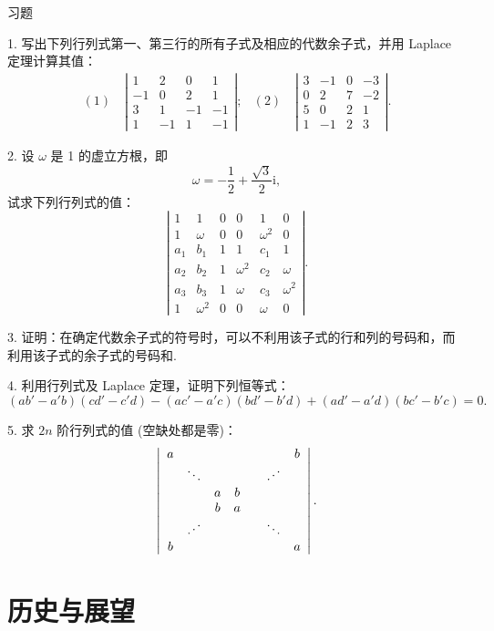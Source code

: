 \documentclass[UTF8,12pt,a4paper,fontset=fandol]{ctexart}
\begin{document}
\begin{center}
习\quad 题
\end{center}

1. 写出下列行列式第一、第三行的所有子式及相应的代数余子式，并用 Laplace 定理计算其值：
\[
\begin{array}{ll}
(1)\quad
\left|\begin{array}{rrrr}
1&2&0&1\\
-1&0&2&1\\
3&1&-1&-1\\
1&-1&1&-1
\end{array}\right|;
&
(2)\quad
\left|\begin{array}{rrrr}
3&-1&0&-3\\
0&2&7&-2\\
5&0&2&1\\
1&-1&2&3
\end{array}\right|.
\end{array}
\]

2. 设 $\omega$ 是 1 的虚立方根，即
\[
\omega=-\frac{1}{2}+\frac{\sqrt{3}}{2}\mathrm{i},
\]
试求下列行列式的值：
\[
\left|\begin{array}{cccccc}
1&1&0&0&1&0\\
1&\omega&0&0&\omega^2&0\\
a_1&b_1&1&1&c_1&1\\
a_2&b_2&1&\omega^2&c_2&\omega\\
a_3&b_3&1&\omega&c_3&\omega^2\\
1&\omega^2&0&0&\omega&0
\end{array}\right|.
\]

3. 证明：在确定代数余子式的符号时，可以不利用该子式的行和列的号码和，而利用该子式的余子式的号码和.

4. 利用行列式及 Laplace 定理，证明下列恒等式：
\[
(ab'-a'b)(cd'-c'd)-(ac'-a'c)(bd'-b'd)+(ad'-a'd)(bc'-b'c)=0.
\]

5. 求 $2n$ 阶行列式的值 (空缺处都是零)：
\[
\left|\begin{array}{ccccccc}
a&&&&&&b\\
&\ddots&&&&\reflectbox{$\ddots$}&\\
&&a&b&&&\\
&&b&a&&&\\
&\reflectbox{$\ddots$}&&&&\ddots&\\
b&&&&&&a
\end{array}\right|.
\]

\section*{历史与展望}
\end{document}
